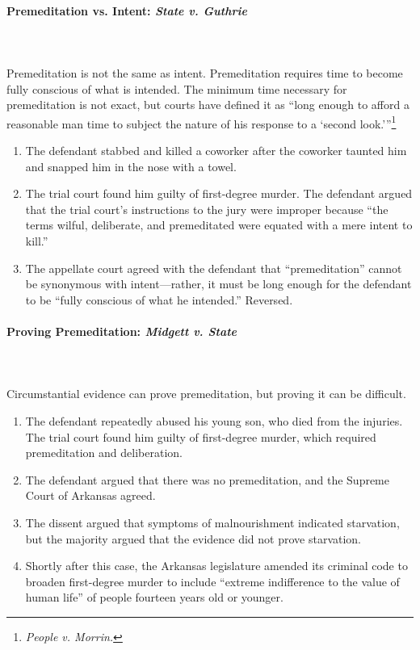\paragraph{Premeditation vs. Intent: \emph{State v. Guthrie}}
~\\\\
Premeditation is not the same as intent. Premeditation requires time to become 
fully conscious of what is intended. The minimum time necessary for 
premeditation is not exact, but courts have defined it as \enquote{long enough 
to afford a reasonable man time to subject the nature of his response to a 
\enquote{second look.}}\footnote{\emph{People v. Morrin.}}

\begin{enumerate}
    \item The defendant stabbed and killed a coworker after the coworker 
    taunted him and snapped him in the nose with a towel.
    \item The trial court found him guilty of first-degree murder. The 
    defendant argued that the trial court's instructions to the jury were 
    improper because ``the terms wilful, deliberate, and premeditated were 
    equated with a mere intent to kill.''
    \item The appellate court agreed with the defendant that ``premeditation'' 
    cannot be synonymous with intent---rather, it must be long enough for the 
    defendant to be ``fully conscious of what he intended.'' Reversed.
\end{enumerate}

\paragraph{Proving Premeditation: \emph{Midgett v. State}}
~\\\\
Circumstantial evidence can prove premeditation, but proving it can be 
difficult.

\begin{enumerate}
    \item The defendant repeatedly abused his young son, who died from the 
    injuries. The trial court found him guilty of first-degree murder, which 
    required premeditation and deliberation.
    \item The defendant argued that there was no premeditation, and the 
    Supreme Court of Arkansas agreed.
    \item The dissent argued that symptoms of malnourishment indicated 
    starvation, but the majority argued that the evidence did not prove 
    starvation.
    \item Shortly after this case, the Arkansas legislature amended its 
    criminal code to broaden first-degree murder to include ``extreme 
    indifference to the value of human life'' of people fourteen years old or 
    younger.
\end{enumerate}

